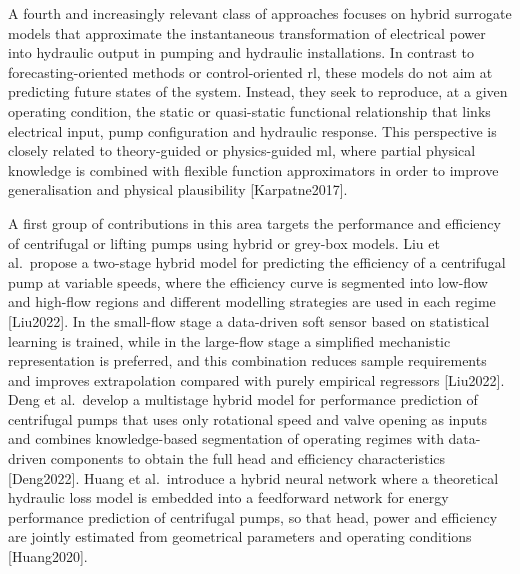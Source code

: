 A fourth and increasingly relevant class of approaches focuses on hybrid surrogate models that approximate the instantaneous transformation of electrical power into hydraulic output in pumping and hydraulic installations. In contrast to forecasting-oriented methods or control-oriented \acrshort{rl}, these models do not aim at predicting future states of the system. Instead, they seek to reproduce, at a given operating condition, the static or quasi-static functional relationship that links electrical input, pump configuration and hydraulic response. This perspective is closely related to theory-guided or physics-guided \acrshort{ml}, where partial physical knowledge is combined with flexible function approximators in order to improve generalisation and physical plausibility [Karpatne2017].

A first group of contributions in this area targets the performance and efficiency of centrifugal or lifting pumps using hybrid or grey-box models. Liu et al.\ propose a two-stage hybrid model for predicting the efficiency of a centrifugal pump at variable speeds, where the efficiency curve is segmented into low-flow and high-flow regions and different modelling strategies are used in each regime [Liu2022]. In the small-flow stage a data-driven soft sensor based on statistical learning is trained, while in the large-flow stage a simplified mechanistic representation is preferred, and this combination reduces sample requirements and improves extrapolation compared with purely empirical regressors [Liu2022].\\

Deng et al.\ develop a multistage hybrid model for performance prediction of centrifugal pumps that uses only rotational speed and valve opening as inputs and combines knowledge-based segmentation of operating regimes with data-driven components to obtain the full head and efficiency characteristics [Deng2022]. Huang et al.\ introduce a hybrid neural network where a theoretical hydraulic loss model is embedded into a feedforward network for energy performance prediction of centrifugal pumps, so that head, power and efficiency are jointly estimated from geometrical parameters and operating conditions [Huang2020].\\


